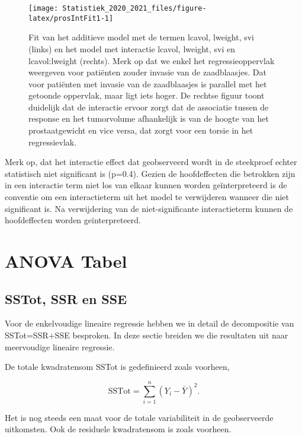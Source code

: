 \documentclass[
  12pt,dutch,coursenotes]{book}
\theoremstyle{definition}
\theoremstyle{definition}
\theoremstyle{definition}
\theoremstyle{remark}
\begin{document}
\begin{figure}

{\centering \texttt{[image: Statistiek\_2020\_2021\_files/figure-latex/prosIntFit1-1]} 

}

\caption{Fit van het additieve model met de termen lcavol, lweight, svi (links) en het model met interactie lcavol, lweight, svi en lcavol:lweight (rechts). Merk op dat we enkel het regressieoppervlak weergeven voor patiënten zouder invasie van de zaadblaasjes. Dat voor patiënten met invasie van de zaadblaasjes is parallel met het getoonde oppervlak, maar ligt iets hoger. De rechtse figuur toont duidelijk dat de interactie ervoor zorgt dat de associatie tussen de response en het tumorvolume afhankelijk is van de hoogte van het prostaatgewicht en vice versa, dat zorgt voor een torsie in het regressievlak.}\label{fig:prosIntFit1}
\end{figure}

Merk op, dat het interactie effect dat geobserveerd wordt in de steekproef echter statistisch niet significant is (p=0.4).
Gezien de hoofdeffecten die betrokken zijn in een interactie term niet los van elkaar kunnen worden geïnterpreteerd is de conventie om een interactieterm uit het model te verwijderen wanneer die niet significant is. Na verwijdering van de niet-significante interactieterm kunnen de hoofdeffecten worden geïnterpreteerd.

\hypertarget{anova-tabel-2}{%
\section{ANOVA Tabel}\label{anova-tabel-2}}

\hypertarget{sstot-ssr-en-sse}{%
\subsection{SSTot, SSR en SSE}\label{sstot-ssr-en-sse}}

Voor de enkelvoudige lineaire regressie hebben we in detail de decompositie van SSTot=SSR+SSE besproken. In deze sectie breiden we die resultaten uit naar meervoudige lineaire regressie.

De totale kwadratensom SSTot is gedefinieerd zoals voorheen,

\[
  \text{SSTot} = \sum_{i=1}^n (Y_i - \bar{Y})^2.
\]

Het is nog steeds een maat voor de totale variabiliteit in de geobserveerde uitkomsten.
Ook de residuele kwadratensom is zoals voorheen.
\end{document}
